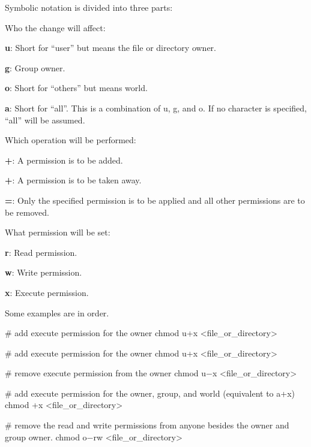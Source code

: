 Symbolic notation is divided into three parts:
\bit
\item Who the change will affect:
\bit
\item \textbf{u}: Short for ``user'' but means the file or directory owner.
\item \textbf{g}: Group owner.
\item \textbf{o}: Short for ``others'' but means world.
\item \textbf{a}: Short for ``all''. This is a combination of u, g, and o. If no character is specified, ``all'' will be
assumed.
\eit
\item Which operation will be performed:
\bit
\item \textbf{+}: A permission is to be added.
\item \textbf{+}: A permission is to be taken away.
\item \textbf{=}: Only the specified permission is to be applied and all other permissions are to be removed.
\eit
\item What permission will be set:
\bit
\item \textbf{r}: Read permission.
\item \textbf{w}: Write permission.
\item \textbf{x}: Execute permission.
\eit
\eit

Some examples are in order.

\be
\begin{bash}
# add execute permission for the owner
chmod u+x <file_or_directory>
\end{bash}

\begin{bash}
# add execute permission for the owner
chmod u+x <file_or_directory>
\end{bash}

\begin{bash}
# remove execute permission from the owner
chmod u$-$x <file_or_directory>
\end{bash}

\begin{bash}
# add execute permission for the owner, group, and world (equivalent to a+x)
chmod +x <file_or_directory>
\end{bash}

\begin{bash}
# remove the read and write permissions from anyone besides the owner and group owner.
chmod o$-$rw <file_or_directory>
\end{bash}

